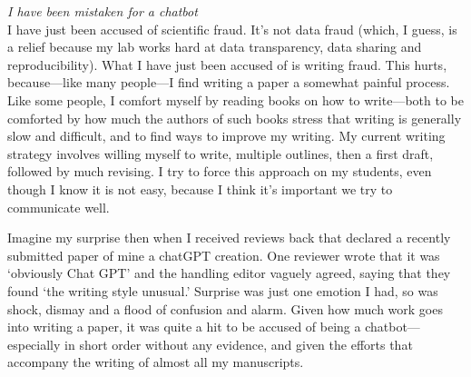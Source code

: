 \documentclass[11pt]{article}
\begin{document}

\renewcommand{\refname}{\CHead{}}


\emph{I have been mistaken for a chatbot}\\%

I have just been accused of scientific fraud. It's not data fraud (which, I guess, is a relief because my lab works hard at data transparency, data sharing and reproducibility). What I have just been accused of is writing fraud. This hurts, because---like many people---I find writing a paper a somewhat painful process. %
Like some people, I comfort myself by reading books on how to write---both to be comforted by how much the authors of such books stress that writing is generally slow and difficult, and to find ways to improve my writing. My current writing strategy involves willing myself to write, multiple outlines, then a first draft, followed by much revising. I try to force this approach on my students, even though I know it is not easy, because I think it's important we try to communicate well.


Imagine my surprise then when I received reviews back that declared a recently submitted paper of mine a chatGPT creation. One reviewer wrote that it was `obviously Chat GPT' and the handling editor vaguely agreed, saying that they found `the writing style unusual.' Surprise was just one emotion I had, so was shock, dismay and a flood of confusion and alarm. Given how much work goes into writing a paper, it was quite a hit to be accused of being a chatbot---especially in short order without any evidence, and given the efforts that accompany the writing of almost all my manuscripts. 
\end{document}
